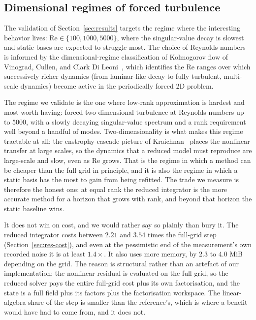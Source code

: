 \subsection{Dimensional regimes of forced turbulence}
\label{sec:disc-dim}

The validation of Section~\ref{sec:results} targets the regime where the
interesting behavior lives: $\mathrm{Re} \in \{100, 1000, 5000\}$, where the
singular-value decay is slowest and static bases are expected to struggle
most. The choice of Reynolds numbers is informed by the dimensional-regime
classification of Kolmogorov flow of Vinograd, Cullen, and Clark Di
Leoni~\cite{vinograd2026}, which identifies the Re ranges over which
successively richer dynamics (from laminar-like decay to fully turbulent,
multi-scale dynamics) become active in the periodically forced 2D problem.

The regime we validate is the one where low-rank approximation is hardest and most
worth having: forced two-dimensional turbulence at Reynolds numbers up to $5000$, with
a slowly decaying singular-value spectrum and a rank requirement well beyond a handful
of modes. Two-dimensionality is what makes this regime tractable at all: the
enstrophy-cascade picture of Kraichnan~\cite{kraichnan1967} places the nonlinear
transfer at large scales, so the dynamics that a reduced model must reproduce are
large-scale and slow, even as $\mathrm{Re}$ grows. That is the regime in which a method can be cheaper than the full grid in
principle, and it is also the regime in which a static basis has the most to gain from
being refitted. The trade we measure is therefore the honest one: at equal rank the
reduced integrator is the more accurate method for a horizon that grows with rank, and
beyond that horizon the static baseline wins.

It does not win on cost, and we would rather say so plainly than bury it. The reduced
integrator costs between $2.21$ and $3.54$ times the full-grid step
(Section~\ref{sec:res-cost}), and even at the
pessimistic end of the measurement's own recorded noise it is at least $1.4\times$. It
also uses more memory, by $2.3$ to $4.0$ MiB depending on the grid. The reason is
structural rather than an artefact of our implementation: the nonlinear residual is
evaluated on the full grid, so the reduced solver pays the entire full-grid cost plus
its own factorisation, and the state is a full field plus its factors plus the
factorisation workspace. The linear-algebra share of the step is smaller than the
reference's, which is where a benefit would have had to come from, and it does not.

